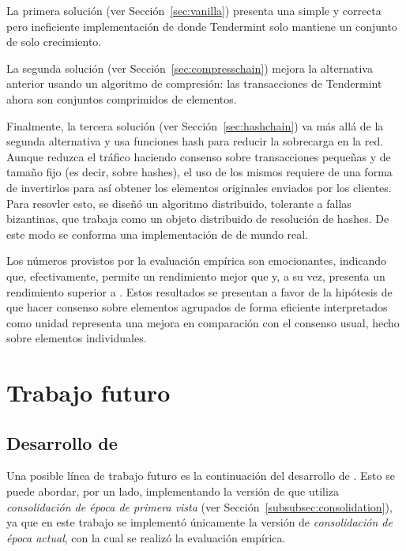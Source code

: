 %
La primera solución (ver Sección~\ref{sec:vanilla}) presenta una simple y
correcta pero ineficiente implementación de \setchain donde Tendermint solo mantiene
un conjunto de solo crecimiento.

%
La segunda solución (ver Sección~\ref{sec:compresschain}) mejora la alternativa anterior
usando un algoritmo de compresión: las transacciones de Tendermint ahora son conjuntos
comprimidos de elementos.

%
Finalmente, la tercera solución (ver Sección~\ref{sec:hashchain}) va más allá de la
segunda alternativa y usa funciones hash para reducir la sobrecarga en la red.
Aunque reduzca el tráfico haciendo consenso sobre transacciones pequeñas
y de tamaño fijo (es decir, sobre hashes), el uso de los mismos requiere de una forma de
invertirlos para así obtener los elementos originales enviados por los clientes.
Para resovler esto, se diseñó
un algoritmo distribuido, tolerante a fallas bizantinas, que trabaja como un objeto
distribuido de resolución de hashes.
De este modo se conforma una implementación de \setchain de mundo real.

%
%


Los números provistos por la evaluación empírica son emocionantes, indicando que,
efectivamente, \compresschain permite un rendimiento mejor que \vanilla y, a su vez,
\hashchain presenta un rendimiento superior a \compresschain.
Estos resultados se presentan a favor de la hipótesis de que hacer consenso sobre
elementos agrupados de forma eficiente interpretados como unidad representa una
mejora en comparación con el consenso usual, hecho sobre elementos individuales. 

\section{Trabajo futuro}

\subsection{Desarrollo de \hashchain}
Una posible línea de trabajo futuro es la continuación del desarrollo
de \hashchain.
Esto se puede abordar, por un lado, implementando la versión de \hashchain que utiliza
\textit{consolidación de época de primera vista} (ver Sección~\ref{subsubsec:consolidation}),
ya que en este trabajo se implementó únicamente la versión
de \textit{consolidación de época actual}, con la cual se realizó la evaluación
empírica.

